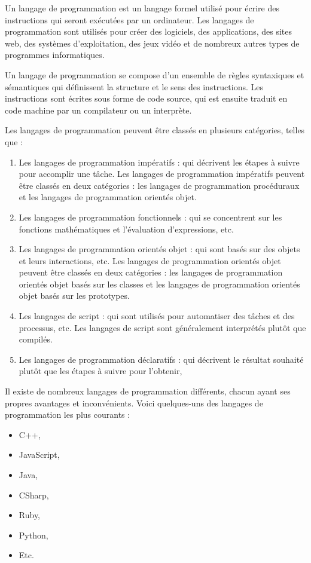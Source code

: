 Un langage de programmation est un langage formel utilisé pour écrire des instructions qui seront exécutées par un ordinateur. Les langages de programmation sont utilisés pour créer des logiciels, des applications, des sites web, des systèmes d'exploitation, des jeux vidéo et de nombreux autres types de programmes informatiques.

Un langage de programmation se compose d'un ensemble de règles syntaxiques et sémantiques qui définissent la structure et le sens des instructions. Les instructions sont écrites sous forme de code source, qui est ensuite traduit en code machine par un compilateur ou un interprète.

Les langages de programmation peuvent être classés en plusieurs catégories, telles que :
\begin{enumerate}
    \item Les langages de programmation impératifs : qui décrivent les étapes à suivre pour accomplir une tâche. Les langages de programmation impératifs peuvent être classés en deux catégories : les langages de programmation procéduraux et les langages de programmation orientés objet.
    \item Les langages de programmation fonctionnels : qui se concentrent sur les fonctions mathématiques et l'évaluation d'expressions, etc. 
    \item Les langages de programmation orientés objet : qui sont basés sur des objets et leurs interactions,  etc. Les langages de programmation orientés objet peuvent être classés en deux catégories : les langages de programmation orientés objet basés sur les classes et les langages de programmation orientés objet basés sur les prototypes.
    \item Les langages de script : qui sont utilisés pour automatiser des tâches et des processus, etc. Les langages de script sont généralement interprétés plutôt que compilés.
    \item Les langages de programmation déclaratifs : qui décrivent le résultat souhaité plutôt que les étapes à suivre pour l'obtenir, 
\end{enumerate}

Il existe de nombreux langages de programmation différents, chacun ayant ses propres avantages et inconvénients. Voici quelques-uns des langages de programmation les plus courants :
\begin{itemize}
    \item C++,
    \item JavaScript,
    \item Java,
    \item CSharp,
    \item Ruby,
    \item Python,
    \item Etc.
\end{itemize}

